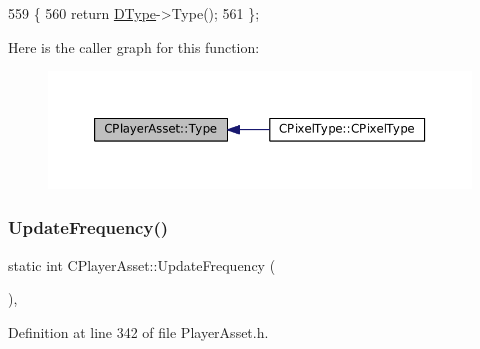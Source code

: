 \begin{DoxyCode}
559                                \{
560             \textcolor{keywordflow}{return} \hyperlink{classCPlayerAsset_a5d61f73471e1e6f0a6ab15f2ffa7b359}{DType}->Type();  
561         \};
\end{DoxyCode}
Here is the caller graph for this function\+:\nopagebreak
\begin{figure}[H]
\begin{center}
\leavevmode
\includegraphics[width=350pt]{classCPlayerAsset_a6d6aeea4e8b02e0f239bac95db6d9e0a_icgraph}
\end{center}
\end{figure}
\hypertarget{classCPlayerAsset_a0aff85b9552967a42f4f3f42cb59c19f}{}\label{classCPlayerAsset_a0aff85b9552967a42f4f3f42cb59c19f} 
\subsubsection{\texorpdfstring{Update\+Frequency()}{UpdateFrequency()}\hspace{0.1cm}{\footnotesize\ttfamily [1/2]}}
{\footnotesize\ttfamily static int C\+Player\+Asset\+::\+Update\+Frequency (\begin{DoxyParamCaption}{ }\end{DoxyParamCaption})\hspace{0.3cm}{\ttfamily [inline]}, {\ttfamily [static]}}



Definition at line 342 of file Player\+Asset.\+h.


